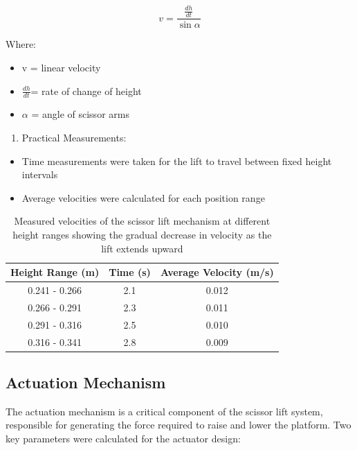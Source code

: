 \documentclass[../../main]{subfiles}
\begin{document}
\begin{equation}
  v = \frac{\frac{dh}{dt}}{\sin \alpha}
\end{equation}

Where:

\begin{itemize}
\item
  v = linear velocity
\item
  \(\frac{dh}{dt}\)= rate of change of height
\item
  $\alpha$ = angle of scissor arms
\end{itemize}

\begin{enumerate}
\def\labelenumi{\arabic{enumi}.}
\item
  Practical Measurements:
\end{enumerate}

\begin{itemize}
\item
  Time measurements were taken for the lift to travel between fixed
  height intervals
\item
  Average velocities were calculated for each position range
\end{itemize}

\begin{table}[h!]
  \centering
  \begin{tabular}{|c|c|c|}
      \hline \rowcolor{red!20}
      \textbf{Height Range (m)} & \textbf{Time (s)} & \textbf{Average Velocity (m/s)} \\ \hline
      0.241 - 0.266 & 2.1 & 0.012 \\ \hline
      0.266 - 0.291 & 2.3 & 0.011 \\ \hline
      0.291 - 0.316 & 2.5 & 0.010 \\ \hline
      0.316 - 0.341 & 2.8 & 0.009 \\ \hline
  \end{tabular}
  \caption[Scissor Lift Velocity Measurements]{Measured velocities of the scissor lift mechanism at different height ranges showing the gradual decrease in velocity as the lift extends upward}
\end{table}

\subsection{Actuation Mechanism}

The actuation mechanism is a critical component of the scissor lift
system, responsible for generating the force required to raise and lower
the platform. Two key parameters were calculated for the actuator
design:
\end{document}
